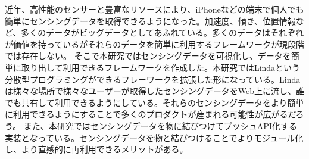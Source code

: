 


\begin{jabstract}
  近年、高性能のセンサーと豊富なリソースにより、iPhoneなどの端末で個人でも簡単にセンシングデータを取得できるようになった。加速度、傾き、位置情報など、多くのデータがビッグデータとしてあふれている。多くのデータはそれぞれが価値を持っているがそれらのデータを簡単に利用するフレームワークが現段階では存在しない。
そこで本研究ではセンシングデータを可視化し、データを簡単に取り出して利用できるフレームワークを作成した。本研究ではLindaという分散型プログラミングができるフレーワークを拡張した形になっている。Lindaは様々な場所で様々なユーザーが取得したセンシングデータをWeb上に流し、誰でも共有して利用できるようにしている。それらのセンシングデータをより簡単に利用できるようにすることで多くのプロダクトが産まれる可能性が広がるだろう。
  また、本研究ではセンシングデータを物に結びつけてプッシュAPI化する実装となっている。センシングデータを物と結びつけることでよりモジュール化し、より直感的に再利用できるメリットがある。

\end{jabstract}



